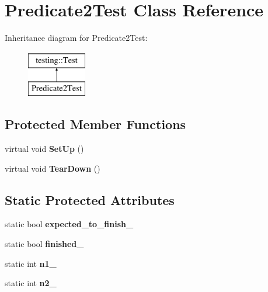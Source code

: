 \hypertarget{class_predicate2_test}{}\section{Predicate2\+Test Class Reference}
\label{class_predicate2_test}
Inheritance diagram for Predicate2\+Test\+:\begin{figure}[H]
\begin{center}
\leavevmode
\includegraphics[height=2.000000cm]{class_predicate2_test}
\end{center}
\end{figure}
\subsection*{Protected Member Functions}
\begin{DoxyCompactItemize}
\item 
\mbox{\label{class_predicate2_test_a9778563daf4846327d32061c1a8ccba0}} 
virtual void {\bfseries Set\+Up} ()
\item 
\mbox{\label{class_predicate2_test_a7379f8f7772af6b4c76edcc90b6aaaeb}} 
virtual void {\bfseries Tear\+Down} ()
\end{DoxyCompactItemize}
\subsection*{Static Protected Attributes}
\begin{DoxyCompactItemize}
\item 
\mbox{\label{class_predicate2_test_a56cf1f0f556addd9a62e0644dc1a86fc}} 
static bool {\bfseries expected\+\_\+to\+\_\+finish\+\_\+}
\item 
\mbox{\label{class_predicate2_test_a30f4ef76d3004253078e767e5c653b85}} 
static bool {\bfseries finished\+\_\+}
\item 
\mbox{\label{class_predicate2_test_ac002d8e279b24e75906fd19973fc2170}} 
static int {\bfseries n1\+\_\+}
\item 
\mbox{\label{class_predicate2_test_a9dbe5173570b9b911af2df889c287027}} 
static int {\bfseries n2\+\_\+}
\end{DoxyCompactItemize}
